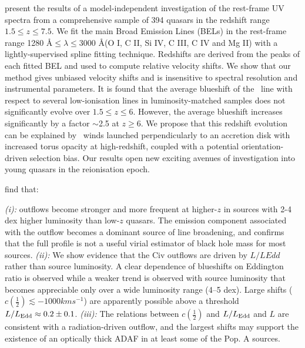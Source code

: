 \documentclass[a4paper,fleqn,usenatbib]{mnras}
\begin{document}
\citet{Meyer2019} present the results of a model-independent investigation of the rest-frame UV spectra from a comprehensive sample of 394 quasars in the redshift range $1.5\leq z \leq 7.5$. We fit the main Broad Emission Lines (BELs) in the rest-frame range 1280 \AA $\leq \lambda \leq $3000 \AA (O I, C II, Si IV, C III, C IV and Mg II) with a lightly-supervised spline fitting technique. Redshifts are derived from the peaks of each fitted BEL and used to compute relative velocity shifts. We show that our method gives unbiased velocity shifts and is insensitive to spectral resolution and instrumental parameters. It is found that the average blueshift of the \civ\, line with respect to several low-ionisation lines in luminosity-matched samples does not significantly evolve over $1.5\leq z\leq 6$. However, the average blueshift increases significantly by a factor $\sim$2.5 at $z \geq 6$. We propose that this redshift evolution can be explained by \civ\, winds launched perpendicularly to an accretion disk with increased torus opacity at high-redshift, coupled with a potential orientation-driven selection bias. Our results open new exciting avenues of investigation into young quasars in the reionisation epoch.



\citet{Sulentic2017} find that:  

{\it (i):} \civ outflows become stronger and more frequent at higher-$z$ in sources with 2-4 dex higher luminosity than low-$z$ quasars. The emission component associated with the outflow becomes a dominant source of line broadening, and confirms that the full \civ profile is not a useful virial estimator of black hole mass for most sources. 
{\it (ii):} We show evidence that the Civ outflows are driven by $L/LEdd$ rather than source luminosity. A clear dependence of \civ blueshifts on Eddington ratio is observed while a weaker trend is observed with source luminosity that becomes appreciable only over a wide luminosity range (4–5 dex). Large shifts ($c(\frac{1}{2}) \lesssim -1000 km s^{-1}$) are apparently possible above a threshold $L/L_{\rm Edd} \approx 0.2\pm0.1$. 
{\it (iii):} The relations between $c(\frac{1}{2})$ and $L/L_{\rm Edd}$ and $L$ are consistent with a radiation-driven outflow, and the largest shifts may support the existence of an optically thick ADAF in at least some of the Pop. A sources.
\end{document}
